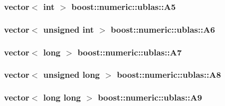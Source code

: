 \subsubsection[{\texorpdfstring{A5}{A5}}]{\setlength{\rightskip}{0pt plus 5cm}vector$<$ int $>$ boost\+::numeric\+::ublas\+::\+A5}\hypertarget{namespaceboost_1_1numeric_1_1ublas_aa06ed90bd1a632f409b7bd155a23b610}{}\label{namespaceboost_1_1numeric_1_1ublas_aa06ed90bd1a632f409b7bd155a23b610}
\subsubsection[{\texorpdfstring{A6}{A6}}]{\setlength{\rightskip}{0pt plus 5cm}vector$<$ unsigned int $>$ boost\+::numeric\+::ublas\+::\+A6}\hypertarget{namespaceboost_1_1numeric_1_1ublas_a563a365ea9deabb74722dac554da1d70}{}\label{namespaceboost_1_1numeric_1_1ublas_a563a365ea9deabb74722dac554da1d70}
\subsubsection[{\texorpdfstring{A7}{A7}}]{\setlength{\rightskip}{0pt plus 5cm}vector$<$ long $>$ boost\+::numeric\+::ublas\+::\+A7}\hypertarget{namespaceboost_1_1numeric_1_1ublas_a665d5a514bd51ed5cb4fea7b064cb0e5}{}\label{namespaceboost_1_1numeric_1_1ublas_a665d5a514bd51ed5cb4fea7b064cb0e5}
\subsubsection[{\texorpdfstring{A8}{A8}}]{\setlength{\rightskip}{0pt plus 5cm}vector$<$ unsigned long $>$ boost\+::numeric\+::ublas\+::\+A8}\hypertarget{namespaceboost_1_1numeric_1_1ublas_abf090883e8b56e426046e0da35d7fa34}{}\label{namespaceboost_1_1numeric_1_1ublas_abf090883e8b56e426046e0da35d7fa34}
\subsubsection[{\texorpdfstring{A9}{A9}}]{\setlength{\rightskip}{0pt plus 5cm}vector$<$ long long $>$ boost\+::numeric\+::ublas\+::\+A9}\hypertarget{namespaceboost_1_1numeric_1_1ublas_a8b6747feac830cb4434b5a06e1e23d9f}{}\label{namespaceboost_1_1numeric_1_1ublas_a8b6747feac830cb4434b5a06e1e23d9f}
